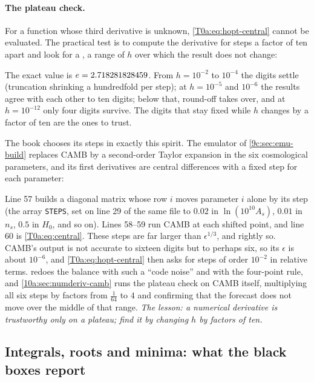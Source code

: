 \paragraph{The plateau check.} For a function whose third derivative is unknown, \eqref{T0a:eq:hopt-central} cannot be evaluated. The practical test is to compute the derivative for steps a factor of ten apart and look for a , a range of $h$ over which the result does not change:


The exact value is $e=2.718281828459$. From $h=10^{-2}$ to $10^{-4}$ the digits settle (truncation shrinking a hundredfold per step); at $h=10^{-5}$ and $10^{-6}$ the results agree with each other to ten digits; below that, round-off takes over, and at $h=10^{-12}$ only four digits survive. The digits that stay fixed while $h$ changes by a factor of ten are the ones to trust.

The book chooses its steps in exactly this spirit. The emulator of \cref{9c:sec:emu-build} replaces CAMB by a second-order Taylor expansion in the six cosmological parameters, and its first derivatives are central differences with a fixed step for each parameter:


Line 57 builds a diagonal matrix whose row $i$ moves parameter $i$ alone by its step (the array \texttt{STEPS}, set on line 29 of the same file to $0.02$ in $\ln(10^{10}A_s)$, $0.01$ in $n_s$, $0.5$ in $H_0$, and so on). Lines 58--59 run CAMB at each shifted point, and line 60 is \eqref{T0a:eq:central}. These steps are far larger than $\epsilon^{1/3}$, and rightly so. CAMB's output is not accurate to sixteen digits but to perhaps six, so its $\epsilon$ is about $10^{-6}$, and \eqref{T0a:eq:hopt-central} then asks for steps of order $10^{-2}$ in relative terms.  redoes the balance with such a ``code noise'' and with the four-point rule, and \cref{10a:sec:numderiv-camb} runs the plateau check on CAMB itself, multiplying all six steps by factors from $\tfrac1{64}$ to $4$ and confirming that the forecast does not move over the middle of that range. \emph{The lesson: a numerical derivative is trustworthy only on a plateau; find it by changing $h$ by factors of ten.}

\subsection{Integrals, roots and minima: what the black boxes report}
\label{T0a:sec:trust-boxes}

